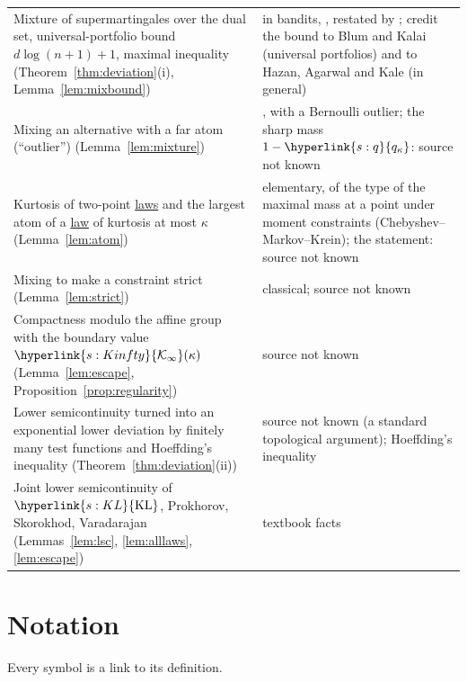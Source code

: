 \documentclass[11pt]{article}
\newcommand{\sy}[2]{{\hyperlink{#1}{#2}}}
\newcommand{\term}[2]{\hyperlink{#1}{#2}}
\newcommand{\KL}{\sy{s:KL}{\mathrm{KL}}}
\newcommand{\qk}{\sy{s:q}{q_{\kappa}}}
\newcommand{\Kinfty}{\sy{s:Kinfty}{\mathcal{K}_{\infty}}}
\begin{document}
\begin{center}
\begin{tabular}{@{}p{}p{}@{}}
Mixture of supermartingales over the dual set, universal-portfolio bound $d\log(n+1)+1$, maximal inequality (Theorem~\ref{thm:deviation}(i), Lemma~\ref{lem:mixbound}) & in bandits, \citet[Lemma~E.1 of the arXiv version]{AKJ21}, restated by \citet[Lemma~11, used for Proposition~5]{AJK21}; \citet{AKJ21} credit the bound to Blum and Kalai (universal portfolios) and to Hazan, Agarwal and Kale (in general) \\
Mixing an alternative with a far atom (``outlier'') (Lemma~\ref{lem:mixture}) & \citet[Appendix~A]{L17}, with a Bernoulli outlier; the sharp mass $1-\qk$: source not known \\
Kurtosis of two-point \term{w:law}{laws} and the largest atom of a \term{w:law}{law} of kurtosis at most $\kappa$ (Lemma~\ref{lem:atom}) & elementary, of the type of the maximal mass at a point under moment constraints (Chebyshev--Markov--Krein); the statement: source not known \\
Mixing to make a constraint strict (Lemma~\ref{lem:strict}) & classical; source not known \\
Compactness modulo the affine group with the boundary value $\Kinfty(\kappa)$ (Lemma~\ref{lem:escape}, Proposition~\ref{prop:regularity}) & source not known \\
Lower semicontinuity turned into an exponential lower deviation by finitely many test functions and Hoeffding's inequality (Theorem~\ref{thm:deviation}(ii)) & source not known (a standard topological argument); Hoeffding's inequality \\
Joint lower semicontinuity of $\KL$, Prokhorov, Skorokhod, Varadarajan (Lemmas~\ref{lem:lsc}, \ref{lem:alllaws}, \ref{lem:escape}) & textbook facts \\
\bottomrule
\end{tabular}
\end{center}

\section{Notation}\label{sec:notation}

Every symbol is a link to its definition.
\end{document}
